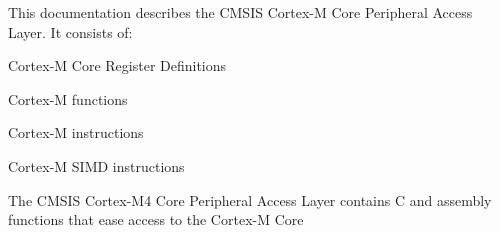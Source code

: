This documentation describes the C\+M\+S\+IS Cortex-\/M Core Peripheral Access Layer. It consists of\+:


\begin{DoxyItemize}
\item Cortex-\/M Core Register Definitions
\item Cortex-\/M functions
\item Cortex-\/M instructions
\item Cortex-\/M S\+I\+MD instructions
\end{DoxyItemize}

The C\+M\+S\+IS Cortex-\/\+M4 Core Peripheral Access Layer contains C and assembly functions that ease access to the Cortex-\/M Core 